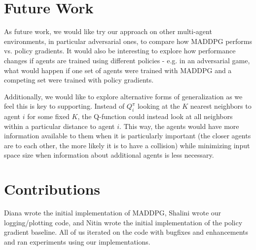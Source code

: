 \documentclass{article}
\begin{document}
\section{Future Work}
As future work, we would like try our approach on other multi-agent environments, in particular adversarial ones, to compare how MADDPG performs vs. policy gradients. It would also be interesting to explore how performance changes if agents are trained using different policies - e.g. in an adversarial game, what would happen if one set of agents were trained with MADDPG and a competing set were trained with policy gradients.

Additionally, we would like to explore alternative forms of generalization as we feel this is key to supporting. Instead of $Q^\pi_i$ looking at the $K$ nearest neighbors to agent $i$ for some fixed $K$, the Q-function could instead look at all neighbors within a particular distance to agent $i$. This way, the agents would have more information available to them when it is particularly important (the closer agents are to each other, the more likely it is to have a collision) while minimizing input space size when information about additional agents is less necessary.

\section*{Contributions}
Diana wrote the initial implementation of MADDPG, Shalini wrote our logging/plotting code, and Nitin wrote the initial implementation of the policy gradient baseline. All of us iterated on the code with bugfixes and enhancements and ran experiments using our implementations.



\end{document}
